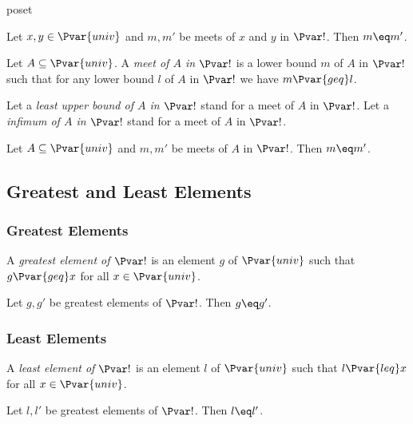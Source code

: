 \documentclass{stex}
\begin{document}
\begin{smodule}{poset}
\begin{proposition*}[forthel,id=MeetOfPairIsUniqueThm,printid]
  Let $x, y \in \Pvar{univ}$ and $m, m'$ be meets of $x$ and $y$ in $\Pvar!$.
  Then $m\eq m'$.
\end{proposition*}
    
\begin{definition*}[forthel,id=MeetOfSetDef,printid]
  Let $A \subseteq \Pvar{univ}$.
  A \emph{meet of $A$ in $\Pvar!$} is a lower bound $m$ of $A$ in $\Pvar!$ such that for any lower bound $l$ of $A$ in $\Pvar!$ we have $m {\Pvar{geq}} l$.

  Let a \emph{least upper bound of $A$ in $\Pvar!$} stand for a meet of $A$ in $\Pvar!$.
  Let a \emph{infimum of $A$ in $\Pvar!$} stand for a meet of $A$ in $\Pvar!$.
\end{definition*}

\begin{proposition*}[forthel,id=MeetOfSetIsUniqueThm,printid]
  Let $A \subseteq \Pvar{univ}$ and $m, m'$ be meets of $A$ in $\Pvar!$.
  Then $m\eq m'$.
\end{proposition*}

\subsection{Greatest and Least Elements}

\subsubsection{Greatest Elements}

\begin{definition*}[forthel,id=GreatestElementDef,printid]
  A \emph{greatest element of $\Pvar!$} is an element $g$ of $\Pvar{univ}$ such that $g {\Pvar{geq}} x$ for all $x \in \Pvar{univ}$.
\end{definition*}

\begin{proposition*}[forthel,id=GreatestElementIsUniqueThm,printid]
  Let $g, g'$ be greatest elements of $\Pvar!$.
  Then $g\eq g'$.
\end{proposition*}

\subsubsection{Least Elements}

\begin{definition*}[forthel,id=LeastElementDef,printid]
  A \emph{least element of $\Pvar!$} is an element $l$ of $\Pvar{univ}$ such that $l {\Pvar{leq}} x$ for all $x \in \Pvar{univ}$.
\end{definition*}

\begin{proposition*}[forthel,id=LeastElementIsUniqueThm,printid]
  Let $l, l'$ be greatest elements of $\Pvar!$.
  Then $l\eq l'$.
\end{proposition*}
\end{smodule}
\end{document}
